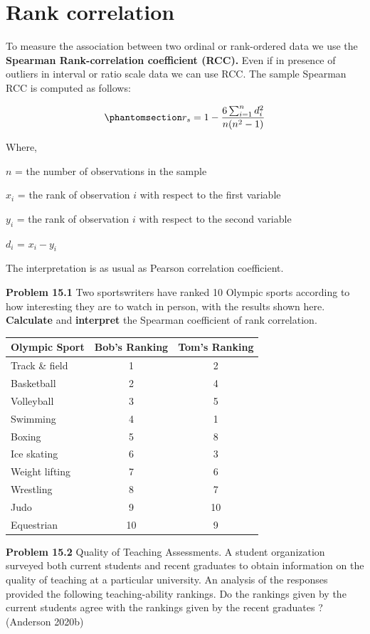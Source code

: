 \documentclass[
  11pt,
  letterpaper,
  DIV=11,
  numbers=noendperiod]{scrreprt}
\begin{document}
\section{Rank correlation}\label{rank-correlation}

To measure the association between two ordinal or rank-ordered data we
use the \textbf{Spearman Rank-correlation coefficient (RCC).} Even if in
presence of outliers in interval or ratio scale data we can use RCC. The
sample Spearman RCC is computed as follows:

\begin{equation}\phantomsection\label{eq-Rcc}{r_s=1-\frac{6\sum_{i=1}^n d_i^2}{n(n^2-1)}}\end{equation}

Where,

\(n\) = the number of observations in the sample

\(x_i\) = the rank of observation \(i\) with respect to the first
variable

\(y_i\) = the rank of observation \(i\) with respect to the second
variable

\(d_i\) = \(x_i-y_i\)

The interpretation is as usual as Pearson correlation coefficient.

\textbf{Problem 15.1} Two sportswriters have ranked 10 Olympic sports
according to how interesting they are to watch in person, with the
results shown here. \textbf{Calculate} and \textbf{interpret} the
Spearman coefficient of rank correlation.

\begin{longtable}[]{@{}lcc@{}}
\toprule\noalign{}
Olympic Sport & Bob's Ranking & Tom's Ranking \\
\midrule\noalign{}
\endhead
\bottomrule\noalign{}
\endlastfoot
Track \& field & 1 & 2 \\
Basketball & 2 & 4 \\
Volleyball & 3 & 5 \\
Swimming & 4 & 1 \\
Boxing & 5 & 8 \\
Ice skating & 6 & 3 \\
Weight lifting & 7 & 6 \\
Wrestling & 8 & 7 \\
Judo & 9 & 10 \\
Equestrian & 10 & 9 \\
\end{longtable}

\textbf{Problem 15.2} Quality of Teaching Assessments. A student
organization surveyed both current students and recent graduates to
obtain information on the quality of teaching at a particular
university. An analysis of the responses provided the following
teaching-ability rankings. Do the rankings given by the current students
agree with the rankings given by the recent graduates ? (Anderson 2020b)
\end{document}
